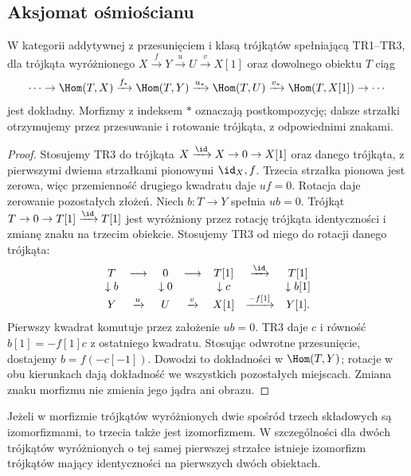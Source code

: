 \subsection{Aksjomat ośmiościanu}
\begin{lemat}\label{cat:lem:triangle-hom-exact}
W kategorii addytywnej z przesunięciem i klasą trójkątów spełniającą TR1--TR3, dla trójkąta wyróżnionego $X\xrightarrow f Y\xrightarrow u U\xrightarrow v X[1]$ oraz dowolnego obiektu $T$ ciąg
\[
 \cdots\to\Hom(T,X)\xrightarrow{f_*}\Hom(T,Y)
 \xrightarrow{u_*}\Hom(T,U)\xrightarrow{v_*}\Hom(T,X[1])\to\cdots
\]
jest dokładny. Morfizmy z indeksem $*$ oznaczają postkompozycję; dalsze strzałki otrzymujemy przez przesuwanie i rotowanie trójkąta, z odpowiednimi znakami.
\end{lemat}
\begin{proof}
Stosujemy TR3 do trójkąta $X\xrightarrow{\id}X\to0\to X[1]$ oraz danego trójkąta, z pierwszymi dwiema strzałkami pionowymi $\id_X,f$. Trzecia strzałka pionowa jest zerowa, więc przemienność drugiego kwadratu daje $uf=0$. Rotacja daje zerowanie pozostałych złożeń.
Niech $b:T\to Y$ spełnia $ub=0$. Trójkąt $T\to0\to T[1]\xrightarrow{\id}T[1]$ jest wyróżniony przez rotację trójkąta identyczności i zmianę znaku na trzecim obiekcie. Stosujemy TR3 od niego do rotacji danego trójkąta:
\[
\begin{array}{ccccccc}
 T&\longrightarrow&0&\longrightarrow&T[1]&\xrightarrow{\id}&T[1]\\
 \downarrow b&&\downarrow 0&&\downarrow c&&\downarrow b[1]\\
 Y&\xrightarrow{u}&U&\xrightarrow{v}&X[1]&\xrightarrow{-f[1]}&Y[1].
\end{array}
\]
Pierwszy kwadrat komutuje przez założenie $ub=0$. TR3 daje $c$ i równość $b[1]=-f[1]c$ z ostatniego kwadratu. Stosując odwrotne przesunięcie, dostajemy $b=f(-c[-1])$. Dowodzi to dokładności w $\Hom(T,Y)$; rotacje w obu kierunkach dają dokładność we wszystkich pozostałych miejscach. Zmiana znaku morfizmu nie zmienia jego jądra ani obrazu.
\end{proof}
\begin{wniosek}\label{cat:cor:triangle-two-isos}
Jeżeli w morfizmie trójkątów wyróżnionych dwie spośród trzech składowych są izomorfizmami, to trzecia także jest izomorfizmem. W szczególności dla dwóch trójkątów wyróżnionych o tej samej pierwszej strzałce istnieje izomorfizm trójkątów mający identyczności na pierwszych dwóch obiektach.
\end{wniosek}
